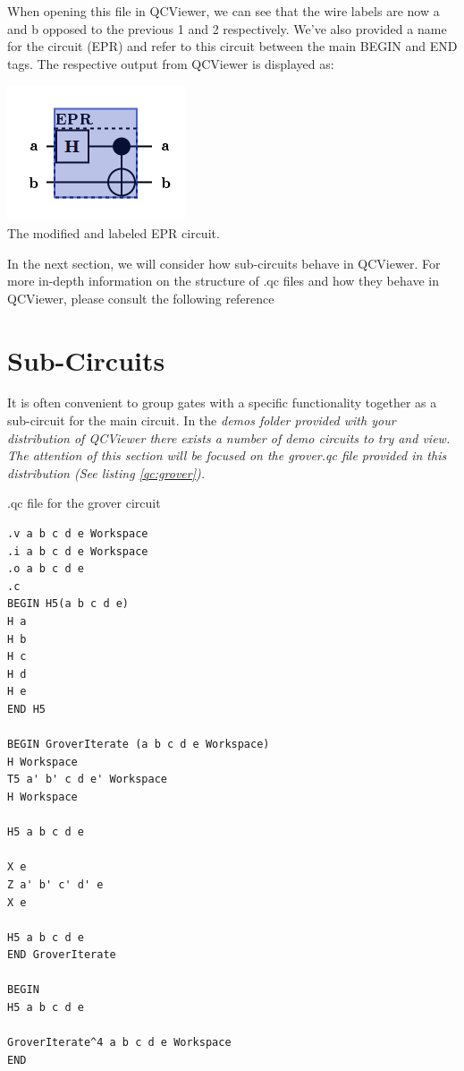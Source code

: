 \documentclass[10pt]{article}
\theoremstyle{definition}
\begin{document}
When opening this file in QCViewer, we can see that the wire labels are now a and b opposed to the previous 1 and 2 respectively. We've also provided a name for the circuit (EPR) and refer to this circuit between the main BEGIN and END tags. The respective output from QCViewer is displayed as:

\begin{center}
\includegraphics[scale=.7]{Figures/QCFiles/EPRCircuitLabel} \\
The modified and labeled EPR circuit.
\end{center}

In the next section, we will consider how sub-circuits behave in QCViewer. For more in-depth information on the structure of .qc files and how they behave in QCViewer, please consult the following reference~\cite{Parent2011Quantum}

\section{Sub-Circuits}\label{sec:SubCircuits}

It is often convenient to group gates with a specific functionality together as a sub-circuit for the main circuit. In the \em demos \em folder provided with your distribution of QCViewer there exists a number of demo circuits to try and view. The attention of this section will be focused on the \em grover.qc \em file provided in this distribution (See listing \ref{qc:grover}).

\begin{program}
\caption{ .qc file for the grover circuit}
\label{qc:grover}
\begin{verbatim}
.v a b c d e Workspace
.i a b c d e Workspace
.o a b c d e
.c
BEGIN H5(a b c d e)
H a
H b
H c
H d
H e
END H5

BEGIN GroverIterate (a b c d e Workspace)
H Workspace
T5 a' b' c d e' Workspace
H Workspace

H5 a b c d e

X e
Z a' b' c' d' e
X e

H5 a b c d e
END GroverIterate

BEGIN
H5 a b c d e

GroverIterate^4 a b c d e Workspace 
END

\end{verbatim}
\end{program}
\end{document}
